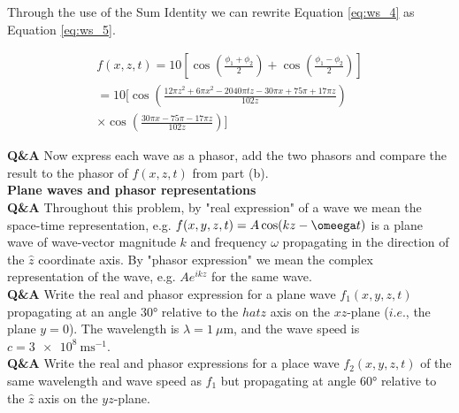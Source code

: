\documentclass[main.tex]{subfiles}
\begin{document}
Through the use of the Sum Identity we can rewrite Equation \ref{eq:ws_4} as Equation \ref{eq:ws_5}.

\begin{equation}\label{eq:ws_5}
\begin{split}
f(x,z,t) = 10[\cos(\frac{\phi_1 + \phi_2}{2}) + \cos(\frac{\phi_1 - \phi_2}{2})] \\
= 10[\cos(\frac{12 \pi z^2 + 6 \pi x^2 -2040\pi t z- 30 \pi x + 75 \pi + 17 \pi z}{102z}) \\
\times \cos(\frac{30 \pi x - 75\pi - 17\pi z}{102z})]
\end{split}
\end{equation}


\textbf{Q&A} Now express each wave as a phasor, add the two phasors and compare the result to the phasor of $f(x,z,t)$ from part (b).\\

\textbf{Plane waves and phasor representations}\\
\textbf{Q\&A} Throughout this problem, by "real expression" of a wave we mean the space-time representation, e.g. $f(x,y,z,t) = A\cos(kz-\omeega t)$ is a plane wave of wave-vector magnitude $k$ and frequency $\omega$ propagating in the direction of the $\hat{z}$ coordinate axis. By "phasor expression" we mean the complex representation of the wave, e.g. $Ae^{ikz}$ for the same wave.\\

\textbf{Q\&A} Write the real and phasor expression for a plane wave $f_1(x,y,z,t)$ propagating at an angle $\ang{30}$ relative to the $hat{z}$ axis on the $xz$-plane ($i.e.$, the plane $y=0$). The wavelength is $\lambda = \SI{1}{\mu \meter}$, and the wave speed is $c = \SI{3e8}{\metre \second^{-1}}$.\\

\textbf{Q\&A} Write the real and phasor expressions for a place wave $f_2(x,y,z,t)$ of the same wavelength and wave speed as $f_1$ but propagating at angle $\ang{60}$ relative to the $\hat{z}$ axis on the $yz$-plane.
\end{document}
